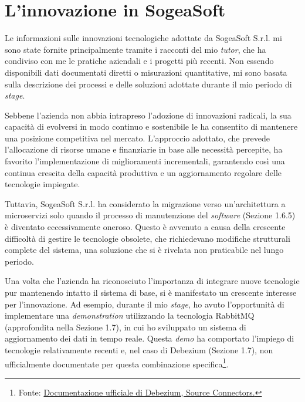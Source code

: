     
    \section{L’innovazione in SogeaSoft}

    Le informazioni sulle innovazioni tecnologiche adottate da SogeaSoft S.r.l. mi sono state fornite principalmente tramite i racconti del mio \textit{tutor}, che ha condiviso con me le pratiche aziendali e i progetti più recenti. Non essendo disponibili dati documentati diretti o misurazioni quantitative, mi sono basata sulla descrizione dei processi e delle soluzioni adottate durante il mio periodo di \textit{stage}.

    \vspace{0.2 em}
    \noindent Sebbene l'azienda non abbia intrapreso l'adozione di innovazioni radicali, la sua capacità di evolversi in modo continuo e sostenibile le ha consentito di mantenere una posizione competitiva nel mercato. L'approccio adottato, che prevede l'allocazione di risorse umane e finanziarie in base alle necessità percepite, ha favorito l'implementazione di miglioramenti incrementali, garantendo così una continua crescita della capacità produttiva e un aggiornamento regolare delle tecnologie impiegate.
    
    \vspace{0.2 em}
    \noindent Tuttavia, SogeaSoft S.r.l. ha considerato la migrazione verso un'architettura a microservizi solo quando il processo di manutenzione del \textit{software} (Sezione 1.6.5) è diventato eccessivamente oneroso. Questo è avvenuto a causa della crescente difficoltà di gestire le tecnologie obsolete, che richiedevano modifiche strutturali complete del sistema, una soluzione che si è rivelata non praticabile nel lungo periodo. 

    \vspace{0.2 em}
    \noindent Una volta che l'azienda ha riconosciuto l'importanza di integrare nuove tecnologie pur mantenendo intatto il sistema di base, si è manifestato un crescente interesse per l'innovazione. Ad esempio, durante il mio \textit{stage}, ho avuto l'opportunità di implementare una \textit{demonstration} utilizzando la tecnologia RabbitMQ (approfondita nella Sezione 1.7), in cui ho sviluppato un sistema di aggiornamento dei dati in tempo reale. Questa \textit{demo} ha comportato l'impiego di tecnologie relativamente recenti e, nel caso di Debezium (Sezione 1.7), non ufficialmente documentate per questa combinazione specifica\footnote{Fonte: \href{https://debezium.io/documentation/reference/3.1/connectors/index.html}{Documentazione ufficiale di Debezium, Source Connectors.}}. 

